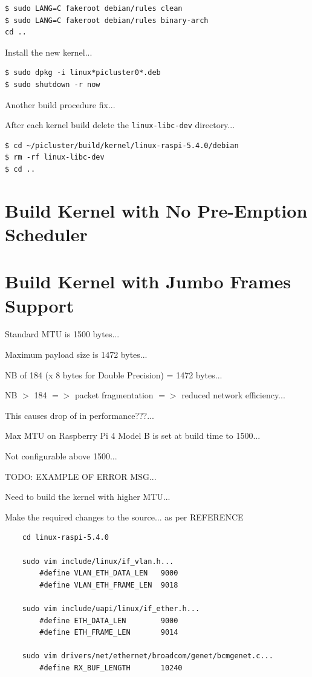 \documentclass{report}
\begin{document}
\lstset{style=termstyle}
\begin{lstlisting}
$ sudo LANG=C fakeroot debian/rules clean
$ sudo LANG=C fakeroot debian/rules binary-arch
cd ..
\end{lstlisting}

Install the new kernel...

\lstset{style=termstyle}
\begin{lstlisting}
$ sudo dpkg -i linux*picluster0*.deb
$ sudo shutdown -r now
\end{lstlisting}

Another build procedure fix...

After each kernel build delete the \verb|linux-libc-dev| directory...

\lstset{style=termstyle}
\begin{lstlisting}
$ cd ~/picluster/build/kernel/linux-raspi-5.4.0/debian
$ rm -rf linux-libc-dev
$ cd ..
\end{lstlisting}


%
%
\chapter{Build Kernel with No Pre-Emption Scheduler}


%
%
\chapter{Build Kernel with Jumbo Frames Support}

Standard MTU is 1500 bytes...

Maximum payload size is 1472 bytes...

NB of 184 (x 8 bytes for Double Precision) = 1472 bytes...

NB $>$ 184 $=>$ packet fragmentation $=>$ reduced network efficiency...

This causes drop of in performance???...

Max MTU on Raspberry Pi 4 Model B is set at build time to 1500...

Not configurable above 1500...

TODO: EXAMPLE OF ERROR MSG...

Need to build the kernel with higher MTU...


Make the required changes to the source... as per REFERENCE

\begin{verbatim}
    cd linux-raspi-5.4.0 

    sudo vim include/linux/if_vlan.h...
        #define VLAN_ETH_DATA_LEN   9000
        #define VLAN_ETH_FRAME_LEN  9018
    
    sudo vim include/uapi/linux/if_ether.h...
        #define ETH_DATA_LEN        9000
        #define ETH_FRAME_LEN       9014
    
    sudo vim drivers/net/ethernet/broadcom/genet/bcmgenet.c...
        #define RX_BUF_LENGTH       10240
\end{verbatim}
\end{document}
